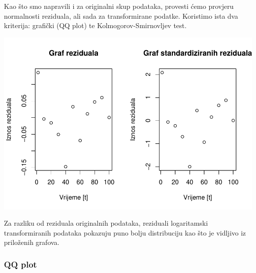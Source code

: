 \documentclass[]{article}
\newenvironment{Shaded}{\begin{snugshade}}{\end{snugshade}}
\newcommand{\KeywordTok}[1]{\textcolor[rgb]{0.13,0.29,0.53}{\textbf{{#1}}}}
\newcommand{\DataTypeTok}[1]{\textcolor[rgb]{0.13,0.29,0.53}{{#1}}}
\newcommand{\DecValTok}[1]{\textcolor[rgb]{0.00,0.00,0.81}{{#1}}}
\newcommand{\StringTok}[1]{\textcolor[rgb]{0.31,0.60,0.02}{{#1}}}
\newcommand{\NormalTok}[1]{{#1}}
\begin{document}
Kao što smo napravili i za originalni skup podataka, provesti ćemo
provjeru normalnosti reziduala, ali sada za transformirane podatke.
Koristimo ista dva kriterija: grafički (QQ plot) te
Kolmogorov-Smirnovljev test.

\begin{Shaded}
\end{Shaded}

\includegraphics{Izvjestaj_files/figure-latex/unnamed-chunk-11-1.pdf}

Za razliku od reziduala originalnih podataka, reziduali logaritamski
transformiranih podataka pokazuju puno bolju distribuciju kao što je
vidljivo iz priloženih grafova.

\subsubsection{QQ plot}\label{qq-plot-1}
\end{document}
